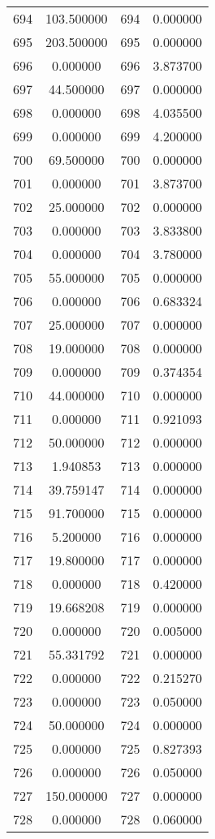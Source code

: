 \documentclass[12pt]{article}
\begin{document}
\begin{longtable}{@{}cccc@{}}
694 & 103.500000 & 694 & 0.000000 \\
695 & 203.500000 & 695 & 0.000000 \\
696 & 0.000000 & 696 & 3.873700 \\
697 & 44.500000 & 697 & 0.000000 \\
698 & 0.000000 & 698 & 4.035500 \\
699 & 0.000000 & 699 & 4.200000 \\
700 & 69.500000 & 700 & 0.000000 \\
701 & 0.000000 & 701 & 3.873700 \\
702 & 25.000000 & 702 & 0.000000 \\
703 & 0.000000 & 703 & 3.833800 \\
704 & 0.000000 & 704 & 3.780000 \\
705 & 55.000000 & 705 & 0.000000 \\
706 & 0.000000 & 706 & 0.683324 \\
707 & 25.000000 & 707 & 0.000000 \\
708 & 19.000000 & 708 & 0.000000 \\
709 & 0.000000 & 709 & 0.374354 \\
710 & 44.000000 & 710 & 0.000000 \\
711 & 0.000000 & 711 & 0.921093 \\
712 & 50.000000 & 712 & 0.000000 \\
713 & 1.940853 & 713 & 0.000000 \\
714 & 39.759147 & 714 & 0.000000 \\
715 & 91.700000 & 715 & 0.000000 \\
716 & 5.200000 & 716 & 0.000000 \\
717 & 19.800000 & 717 & 0.000000 \\
718 & 0.000000 & 718 & 0.420000 \\
719 & 19.668208 & 719 & 0.000000 \\
720 & 0.000000 & 720 & 0.005000 \\
721 & 55.331792 & 721 & 0.000000 \\
722 & 0.000000 & 722 & 0.215270 \\
723 & 0.000000 & 723 & 0.050000 \\
724 & 50.000000 & 724 & 0.000000 \\
725 & 0.000000 & 725 & 0.827393 \\
726 & 0.000000 & 726 & 0.050000 \\
727 & 150.000000 & 727 & 0.000000 \\
728 & 0.000000 & 728 & 0.060000 \\

\end{longtable}
\end{document}
